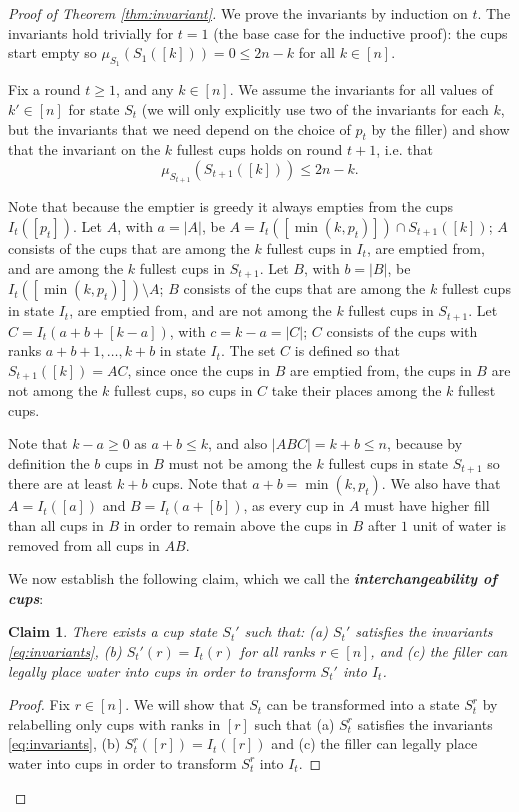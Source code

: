 \documentclass[twocolumn]{article}[10pt]
\newcommand{\defn}[1]{{\textit{\textbf{\boldmath #1}}}\xspace}
\newtheorem{clm}{Claim}
\begin{document}
\begin{proof}[Proof of Theorem \ref{thm:invariant}]
We prove the invariants by induction on $t$.
The invariants hold trivially for $t=1$ (the base case for the inductive proof): 
the cups start empty so $\mu_{S_1}(S_1([k])) = 0 \le 2n-k$ for all $k \in [n]$.

Fix a round $t \ge 1$, and any $k \in [n]$. We assume the invariants for all
values of $k' \in[n]$ for state $S_t$ (we will only explicitly use two of the
invariants for each $k$, but the invariants that we need depend on the
choice of $p_t$ by the filler) and show that
the invariant on the $k$ fullest cups holds on round $t+1$, i.e. that
$$\mu_{S_{t+1}}(S_{t+1}([k])) \le 2n-k.$$

Note that because the emptier is greedy it always empties from the cups
$I_t([p_t])$. Let $A$, with $a=|A|$, be $A = I_t([\min(k, p_t)]) \cap
S_{t+1}([k])$; $A$ consists of the cups that are among the $k$ fullest cups in
$I_t$, are emptied from, and are among the $k$ fullest cups in $S_{t+1}$. Let
$B$, with $b=|B|$, be $I_t([\min(k, p_t)]) \setminus A$; $B$ consists of the
cups that are among the $k$ fullest cups in state $I_t$, are emptied from, and
are not among the $k$ fullest cups in $S_{t+1}$. Let $C = I_t(a+b+[k-a])$, with
$c=k-a = |C|$; $C$ consists of the cups with ranks $a + b + 1, \ldots, k + b$
in state $I_t$. The set $C$ is defined so that $S_{t+1}([k]) = AC$, since once
the cups in $B$ are emptied from, the cups in $B$ are not among the $k$ fullest
cups, so cups in $C$ take their places among the $k$ fullest cups.

Note that $k-a \ge 0$ as $a+b \le k$, and also $|ABC| = k+b \le n$, because by
definition the $b$ cups in $B$ must not be among the $k$ fullest cups in state
$S_{t+1}$ so there are at least $k+b$ cups. 
Note that $a + b = \min(k, p_t)$. We also have that $A = I_t([a])$ and $B =
I_t(a+[b])$, as every cup in $A$ must have higher fill than all cups in $B$ in
order to remain above the cups in $B$ after $1$ unit of water is removed from
all cups in $AB$.

We now establish the following claim, which we call the \defn{interchangeability of cups}:
\begin{clm}
  \label{clm:interchangable}
  There exists a cup state $S_t'$ such that: (a) $S_t'$ satisfies the
  invariants \eqref{eq:invariants}, (b) $S_t'(r) = I_t(r)$ for all ranks
  $r\in[n]$, and (c) the filler can legally place water into cups in order to
  transform $S_t'$ into $I_t$. 
\end{clm}
\begin{proof}
  Fix $r \in [n]$. We will show that $S_t$ can be transformed into a state
  $S_t^r$ by relabelling only cups with ranks in $[r]$ such that (a) $S_t^r$
  satisfies the invariants \eqref{eq:invariants}, (b) $S_t^r([r]) = I_t([r])$
  and (c) the filler can legally place water into cups in order to transform
  $S_t^r$ into $I_t$.


\end{proof}
\end{proof}
\end{document}
